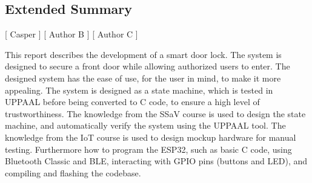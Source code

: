 \subsection*{Extended Summary}
[ Casper ] [ Author B ] [ Author C ] 
\newline

This report describes the development of a smart door lock.
The system is designed to secure a front door while allowing authorized users to enter.
The designed system has the ease of use, for the user in mind, to make it more appealing.
The system is designed as a state machine, which is tested in UPPAAL before being converted to C code, to ensure a high level of trustworthiness.
The knowledge from the SSaV course is used to design the state machine, and automatically verify the system using the UPPAAL tool.
The knowledge from the IoT course is used to design mockup hardware for manual testing.
Furthermore how to program the ESP32, such as basic C code, using Bluetooth Classic and BLE, interacting with GPIO pins (buttons and LED), and compiling and flashing the codebase.